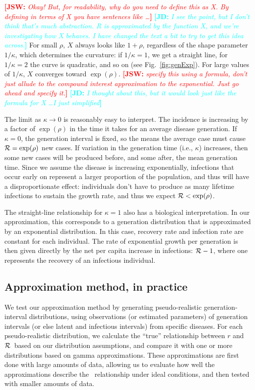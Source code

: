 \documentclass[12pt]{article}
\newcommand{\RR}{\ensuremath{{\cal R}}}
\newcommand{\fref}[1]{Fig.~\ref{fig:#1}}
\newcommand{\comment}[3]{\textcolor{#1}{\textbf{[#2: }\textit{#3}\textbf{]}}}
\newcommand{\jd}[1]{\comment{cyan}{JD}{#1}}
\newcommand{\jsw}[1]{\comment{red}{JSW}{#1}}
\begin{document}
\jsw{Okay!  But, for readability, why do you need to define this as X.  By defining in terms of X you have sentences like \ldots}
\jd{I see the point, but I don't think that's much abstraction. R is approximated by the function X, and we're investigating how X behaves. I have changed the text a bit to try to get this idea across.}
For small $\rho$, $X$ always looks like $1+\rho$, regardless of the shape parameter $1/\kappa$, which determines the curvature: if $1/\kappa = 1$, we get a straight line, for $1/\kappa=2$ the curve is quadratic, and so on (see \fref{genExp}).
For large values of $1/\kappa$, $X$ converges toward $\exp(\rho)$.
\jsw{specify this using a formula, don't just allude to the compound interest approximation to the exponential. Just go ahead and specify it.}
\jd{I thought about this, but it would look just like the formula for X \ldots I just simplified}

The limit as $\kappa\to 0$ is reasonably easy to interpret. The incidence is increasing by a factor of $\exp(\rho)$ in the time it takes for an average disease generation. If $\kappa=0$, the generation interval is fixed, so the means the average case must cause $\RR = \exp(\rho)$ new cases.
If variation in the generation time (i.e., $\kappa$) increases, then some new cases will be produced before, and some after, the mean generation time.
Since we assume the disease is increasing exponentially, infections that occur early on represent a larger proportion of the population, and thus will have a disproportionate effect: individuals don't have to produce as many lifetime infections to sustain the growth rate, and thus we expect  $\RR < \exp(\rho)$.

The straight-line relationship for $\kappa=1$ also has a biological interpretation. 
In our approximation, this corresponds to a generation distribution that is approximated by an exponential distribution. 
In this case, recovery rate and infection rate are constant for each individual.
The rate of exponential growth per generation is then given directly by the net per capita increase in infections: $\RR-1$, where one represents the recovery of an infectious individual.

\subsection{Approximation method, in practice}

We test our approximation method by generating pseudo-realistic generation-interval distributions, using observations (or estimated parameters) of generation intervals (or else latent and infectious intervals) from specific diseases. 
For each pseudo-realistic distribution, we calculate the ``true'' relationship between $r$ and \RR\ based on our distribution assumptions, and compare it with one or more distributions based on gamma approximations. 
These approximations are first done with large amounts of data, allowing us to evaluate how well the approximations describe the \rR\ relationship under ideal conditions, and then tested with smaller amounts of data. 
\end{document}
